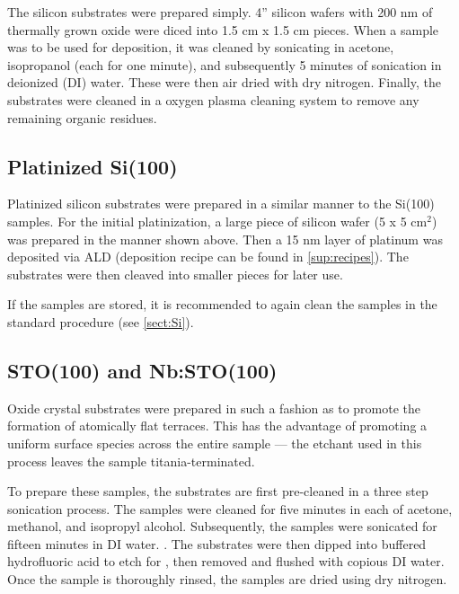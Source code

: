 The silicon substrates were prepared simply. 4'' silicon wafers with 200 nm of thermally grown oxide were diced into 1.5 cm x 1.5 cm pieces. When a sample was to be used for deposition, it was cleaned by sonicating in acetone, isopropanol (each for one minute), and subsequently 5 minutes of sonication in deionized (DI) water. These were then air dried with dry nitrogen. Finally, the substrates were cleaned in a oxygen plasma cleaning system to remove any remaining organic residues. 



\subsection{Platinized Si(100)}

Platinized silicon substrates were prepared in a similar manner to the Si(100) samples. For the initial platinization, a large piece of silicon wafer (5 x 5 cm$^{2}$) was prepared in the manner shown above. Then a 15 nm layer of platinum was deposited via ALD (deposition recipe can be found in \ref{sup:recipes}). The substrates were then cleaved into smaller pieces for later use. 

If the samples are stored, it is recommended to again clean the samples in the standard procedure (see \ref{sect:Si}).


\subsection{STO(100) and Nb:STO(100)}

Oxide crystal substrates were prepared in such a fashion as to promote the formation of atomically flat terraces. This has the advantage of promoting a uniform surface species across the entire sample --- the etchant used in this process leaves the sample titania-terminated. 

To prepare these samples, the substrates are first pre-cleaned in a three step sonication process. The samples were cleaned for five minutes in each of acetone, methanol, and isopropyl alcohol. Subsequently, the samples were sonicated for fifteen minutes in DI water. . The substrates were then dipped into buffered hydrofluoric acid to etch for , then removed and flushed with copious DI water.  Once the sample is thoroughly rinsed, the samples are dried using dry nitrogen. 

